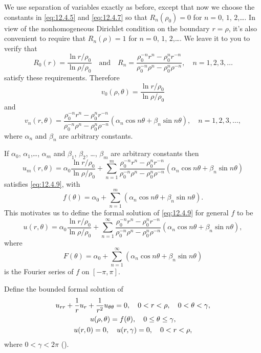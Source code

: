 \begin{solution}
We use separation of variables exactly as before, except that
now we choose the constants in \eqref{eq:12.4.5} and \eqref{eq:12.4.7}
so that $R_n(\rho_0)=0$ for $n=0$, $1$, $2$,\dots. In view of the
nonhomogeneous Dirichlet
condition on the boundary $r=\rho$, it's also convenient to require
that
$R_n(\rho)=1$ for $n=0$, $1$, $2$,\dots. We leave it to you to verify
that
\[
R_0(r)=\frac{\ln r/\rho_0}{\ln\rho/\rho_0}
\quad\text{and}\quad
R_n=\frac{\rho_0^{-n}r^n-\rho_0^nr^{-n}}
{\rho_0^{-n}\rho^n-\rho_0^n\rho^{-n}},\quad n=1,2,3,\dots
\]
satisfy these requirements. Therefore
\[
v_0(\rho,\theta)=\frac{\ln r/\rho_0}{\ln\rho/\rho_0}
\]
and
\[
v_n(r,\theta)=\frac{\rho_0^{-n}r^n-\rho_0^nr^{-n}}
{\rho_0^{-n}\rho^n-\rho_0^n\rho^{-n}}(\alpha_n\cos n\theta+\beta_n\sin
n\theta),
\quad n=1,2,3,\dots,
\]
where $\alpha_n$ and $\beta_n$ are arbitrary constants.

If $\alpha_0$, $\alpha_1$,\dots, $\alpha_m$ and
$\beta_1$,
$\beta_2$,
\dots, $\beta_m$ are arbitrary constants then
\[
u_m(r,\theta)=\alpha_0\frac{\ln r/\rho_0}{\ln\rho/\rho_0}+
\sum_{n=1}^m
\frac{\rho_0^{-n}r^n-\rho_0^nr^{-n}}
{\rho_0^{-n}\rho^n-\rho_0^n\rho^{-n}}
(\alpha_n\cos
n\theta+\beta_n\sin n\theta)
\]
satisfies \eqref{eq:12.4.9}, with
\[
f(\theta)
=\alpha_0+\sum_{n=1}^m(\alpha_n\cos
n\theta+\beta_n\sin n\theta).
\]
This motivates us to define the formal solution of \eqref{eq:12.4.9}
for general $f$ to be
\[
u(r,\theta)=\alpha_0\frac{\ln r/\rho_0}{\ln\rho/\rho_0}+
\sum_{n=1}^\infty
\frac{\rho_0^{-n}r^n-\rho_0^nr^{-n}}
{\rho_0^{-n}\rho^n-\rho_0^n\rho^{-n}}
(\alpha_n\cos
n\theta+\beta_n\sin n\theta),
\]
where
\[
F(\theta)
=\alpha_0+\sum_{n=1}^\infty(\alpha_n\cos
n\theta+\beta_n\sin n\theta)
\]
is the Fourier series of  $f$ on $[-\pi,\pi]$.
\end{solution}

\begin{example}\label{example:12.4.3}
Define the bounded formal solution of
\begin{gather}
u_{rr}+\frac{1}{r}u_r+\frac{1}{r^2}u_{\theta\theta}=0,\quad
0<r<\rho,\quad 0<\theta<\gamma,\notag\\
 u(\rho,\theta)=f(\theta),\quad 0\le\theta\le\gamma,\label{eq:12.4.10}\\
u(r,0)=0,\quad u(r,\gamma)=0,\quad 0<r<\rho,\notag
\end{gather}
where $0<\gamma<2\pi$ ().
\end{example}

